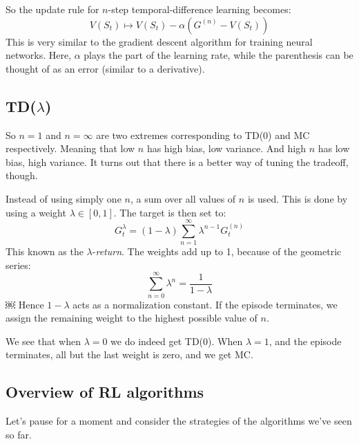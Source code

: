 \documentclass[12pt, a4paper]{article}
\numberwithin{equation}{section}
\begin{document}
So the update rule for $n$-step temporal-difference learning becomes:
\begin{equation}
V(S_t)\mapsto V(S_t)-\alpha(G^{(n)}-V(S_t))
\end{equation}
This is very similar to the gradient descent algorithm for training neural networks. Here, $\alpha$ plays the part of the learning rate, while the parenthesis can be thought of as an error (similar to a derivative).

\subsection{TD($\lambda$)}
So $n=1$ and $n=\infty$ are two extremes corresponding to TD(0) and MC respectively. Meaning that low $n$ has high bias, low variance. And high $n$ has low bias, high variance. It turns out that there is a better way of tuning the tradeoff, though.

Instead of using simply one $n$, a sum over all values of $n$ is used. This is done by using a weight $\lambda\in[0,1]$. The target is then set to:
\begin{equation}
G^\lambda_t=(1-\lambda)\sum_{n=1}^\infty\lambda^{n-1}G^{(n)}_t
\end{equation}
This known as the $\lambda$-\textit{return}. The weights add up to 1, because of the geometric series:
\begin{equation}
\sum_{n=0}^\infty\lambda^n=\frac{1}{1-\lambda}
\end{equation}￼
Hence $1-\lambda$ acts as a normalization constant. If the episode terminates, we assign the remaining weight to the highest possible value of $n$.

We see that when $\lambda=0$ we do indeed get TD(0). When $\lambda=1$, and the episode terminates, all but the last weight is zero, and we get MC.

\subsection{Overview of RL algorithms}
Let's pause for a moment and consider the strategies of the algorithms we've seen so far.
\end{document}
